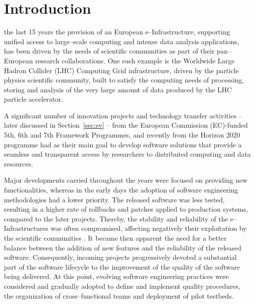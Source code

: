 \documentclass[journal]{IEEEtran}
\begin{document}
\section{Introduction}

 the last 15 years the provision of an European e--Infrastructure,
supporting unified access to large--scale computing and intense data analysis
applications, has been driven by the needs of scientific communities as part of their
pan--European research collaborations. One such example is the Worldwide
Large Hadron Collider (LHC) Computing Grid infrastructure, driven
by the particle physics scientific community, built to satisfy the computing needs
of processing, storing and analysis of the very large amount of data produced by the
LHC particle accelerator.

A significant number of innovation projects and technology transfer
activities -- later discussed in Section~\ref{sec:ev} -- from the European Commission
(EC)-funded 5th, 6th and 7th Framework Programmes, and recently from the Horizon 2020 programme
\cite{h2020} had as their main goal to develop software solutions that provide a seamless and
transparent access by researchers to distributed computing and data resources.

Major developments carried throughout the years were focused on providing new
functionalities, whereas in the early days the adoption of software engineering methodologies had a lower priority.
The released software was less tested, resulting in a higher rate of
rollbacks and patches applied to production systems, compared to the later projects. Thereby, the stability and
reliability of the e--Infrastructures was often compromised, affecting
negatively their exploitation by the scientific communities \cite{aiftimiei}.
It became then apparent the need for a better balance between the addition of new features
and the reliability of the released software. Consequently, incoming projects progressively
devoted a substantial part of the software lifecycle to the improvement of the quality of the
software being delivered. At this point, evolving software engineering practices were considered
and gradually adopted to define and implement quality procedures, the organization of
cross--functional teams and deployment of pilot testbeds.
\end{document}
